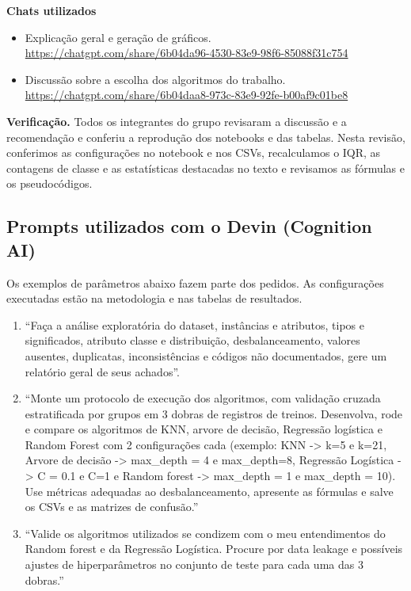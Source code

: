 \documentclass[11pt,a4paper]{article}
\begin{document}
\textbf{Chats utilizados}
\begin{itemize}\setlength{\itemsep}{1pt}
  \item Explicação geral e geração de gráficos.\\
  \url{https://chatgpt.com/share/6b04da96-4530-83e9-98f6-85088f31c754}
  \item Discussão sobre a escolha dos algoritmos do trabalho.\\
  \url{https://chatgpt.com/share/6b04daa8-973c-83e9-92fe-b00af9c01be8}
\end{itemize}

\textbf{Verificação.} Todos os integrantes do grupo revisaram a discussão
e a recomendação e conferiu a reprodução dos notebooks e das tabelas.
Nesta revisão, conferimos as configurações no notebook e nos CSVs,
recalculamos o IQR, as contagens de classe e as estatísticas destacadas
no texto e revisamos as fórmulas e os pseudocódigos.

\subsection*{Prompts utilizados com o Devin (Cognition AI)}
Os exemplos de parâmetros abaixo fazem parte dos pedidos. As
configurações executadas estão na metodologia e nas tabelas de resultados.

\begin{enumerate}
  \item ``Faça a análise exploratória do dataset, instâncias e atributos, tipos e significados, atributo classe e distribuição, desbalanceamento, valores ausentes, duplicatas, inconsistências e códigos não documentados, gere um relatório geral de seus achados''.
  \item ``Monte um protocolo de execução dos algoritmos, com validação cruzada estratificada por grupos em 3 dobras de registros de treinos. Desenvolva, rode e compare os algoritmos de KNN, arvore de decisão, Regressão logística e Random Forest com 2 configurações cada (exemplo: KNN -> k=5 e k=21, Arvore de decisão -> max\_depth = 4 e max\_depth=8, Regressão Logística -> C = 0.1 e C=1 e Random forest -> max\_depth = 1 e max\_depth = 10). Use métricas adequadas ao desbalanceamento, apresente as fórmulas e salve os CSVs e as matrizes de confusão.''
  \item ``Valide os algoritmos utilizados se condizem com o meu entendimentos do Random forest e da Regressão Logística. Procure por data leakage e possíveis ajustes de hiperparâmetros no conjunto de teste para cada uma das 3 dobras.''
\end{enumerate}
\end{document}

